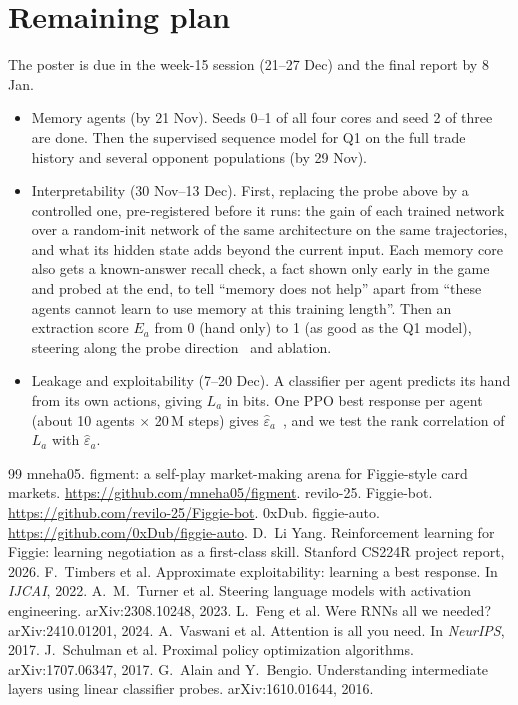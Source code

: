 \documentclass{article}
\begin{document}
\section{Remaining plan}
The poster is due in the week-15 session (21--27 Dec) and the final report by 8 Jan.
\begin{itemize}
  \item Memory agents (by 21 Nov). Seeds 0--1 of all four cores and seed 2 of three are done. Then the supervised sequence model for Q1 on the full trade history and several opponent populations (by 29 Nov).
  \item Interpretability (30 Nov--13 Dec). First, replacing the probe above by a controlled one, pre-registered before it runs: the gain of each trained network over a random-init network of the same architecture on the same trajectories, and what its hidden state adds beyond the current input. Each memory core also gets a known-answer recall check, a fact shown only early in the game and probed at the end, to tell ``memory does not help'' apart from ``these agents cannot learn to use memory at this training length''. Then an extraction score $E_a$ from 0 (hand only) to 1 (as good as the Q1 model), steering along the probe direction~\cite{actadd} and ablation.
  \item Leakage and exploitability (7--20 Dec). A classifier per agent predicts its hand from its own actions, giving $L_a$ in bits. One PPO best response per agent (about 10 agents $\times$ 20\,M steps) gives $\hat\varepsilon_a$~\cite{timbers}, and we test the rank correlation of $L_a$ with $\hat\varepsilon_a$.
\end{itemize}

{\small
\begin{thebibliography}{99}\setlength{\itemsep}{0pt}\setlength{\parskip}{0pt}
 mneha05. \newblock figment: a self-play market-making arena for Figgie-style card markets. \newblock \url{https://github.com/mneha05/figment}.
 revilo-25. \newblock Figgie-bot. \newblock \url{https://github.com/revilo-25/Figgie-bot}.
 0xDub. \newblock figgie-auto. \newblock \url{https://github.com/0xDub/figgie-auto}.
 D.~Li Yang. \newblock Reinforcement learning for Figgie: learning negotiation as a first-class skill. \newblock Stanford CS224R project report, 2026.
 F.~Timbers et al. \newblock Approximate exploitability: learning a best response. \newblock In \emph{IJCAI}, 2022.
 A.~M.~Turner et al. \newblock Steering language models with activation engineering. \newblock arXiv:2308.10248, 2023.
 L.~Feng et al. \newblock Were RNNs all we needed? \newblock arXiv:2410.01201, 2024.
 A.~Vaswani et al. \newblock Attention is all you need. \newblock In \emph{NeurIPS}, 2017.
 J.~Schulman et al. \newblock Proximal policy optimization algorithms. \newblock arXiv:1707.06347, 2017.
 G.~Alain and Y.~Bengio. \newblock Understanding intermediate layers using linear classifier probes. \newblock arXiv:1610.01644, 2016.
\end{thebibliography}
}
\end{document}
